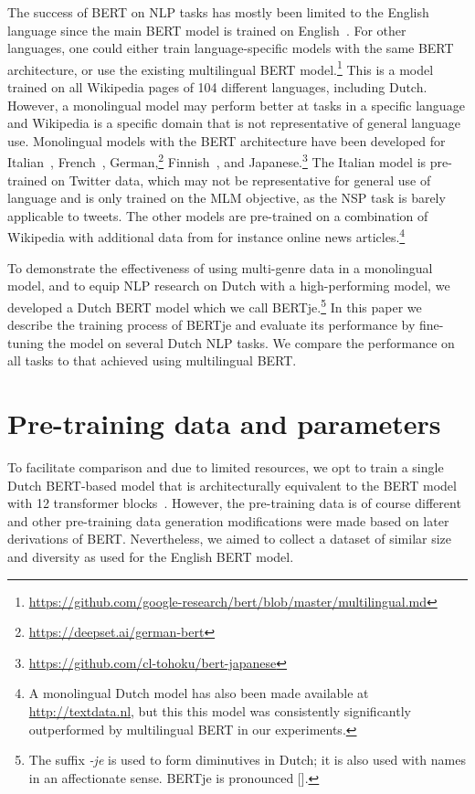 \documentclass[11pt]{article}
\begin{document}
The success of BERT on NLP tasks has mostly been limited to the English language since the main BERT model is trained on English~\citep{devlin2019bert}.
For other languages, one could either train language-specific models with the same BERT architecture, or use the existing multilingual BERT model.\footnote{\url{https://github.com/google-research/bert/blob/master/multilingual.md}}
This is a model trained on all Wikipedia pages of 104 different languages, including Dutch.
However, a monolingual model may perform better at tasks in a specific language and Wikipedia is a specific domain that is not representative of general language use.
Monolingual models with the BERT architecture have been developed for Italian~\citep{polignano2019alberto},
French~\citep{le2019flaubert},
German,\footnote{\url{https://deepset.ai/german-bert}}
Finnish~\citep{virtanen2019multilingual},
and Japanese.\footnote{\url{https://github.com/cl-tohoku/bert-japanese}}
The Italian model is pre-trained on Twitter data, which may not be representative for general use of language and is only trained on the MLM objective, as the NSP task is barely applicable to tweets.
The other models are pre-trained on a combination of Wikipedia with additional data from for instance online news articles.\footnote{A monolingual Dutch model has also been made available at \url{http://textdata.nl}, but this this model was consistently significantly outperformed by multilingual BERT in our experiments.}

To demonstrate the effectiveness of using multi-genre data in a monolingual model, and to equip NLP research on Dutch with a high-performing model, we developed a Dutch BERT model which we call BERTje.\footnote{The suffix \emph{-je} is used to form diminutives in Dutch; it is also used with names in an affectionate sense. BERTje is pronounced  [].} In this paper we describe the training process of BERTje and evaluate its performance by fine-tuning the model on several Dutch NLP tasks.
We compare the performance on all tasks to that achieved using multilingual BERT.

\section{Pre-training data and parameters}
To facilitate comparison and due to limited resources,
we opt to train a single Dutch BERT-based model
that is architecturally equivalent to the BERT model with 12 transformer blocks~\citep{devlin2019bert}.
However, the pre-training data is of course different
and other pre-training data generation modifications were made based on later derivations of BERT.
Nevertheless, we aimed to collect a dataset of similar size and diversity as used for the English BERT model.
\end{document}
